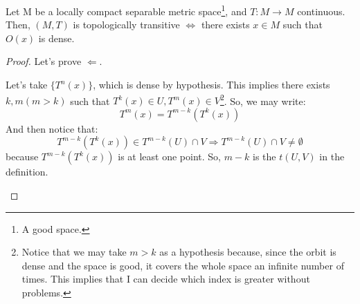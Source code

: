 \begin{proposition}
    Let M be a locally compact separable metric space\footnote{A good space.}, and $T:M\rightarrow M$ continuous. Then,  $(M, T)$ is topologically transitive $\iff$ there exists $x\in M$ such that $O(x)$ is dense.
\end{proposition}
\begin{proof}
    Let's prove $\Leftarrow$.

    Let's take $\{T^n(x)\}$, which is dense by hypothesis. This implies there exists $k,m (m>k)$ such that $T^k(x)\in U, T^m(x)\in V$\footnote{Notice that we may take $m>k$ as a hypothesis because, since the orbit is dense and the space is good, it covers the whole space an infinite number of times. This implies that I can decide which index is greater without problems.}. 
    So, we may write: \begin{equation*}
        T^m(x)=T^{m-k}(T^k(x))
    \end{equation*}
    And then notice that: \begin{equation*}
        T^{m-k}(T^k(x))\in T^{m-k}(U)\cap V \Rightarrow T^{m-k}(U)\cap V\neq \emptyset
    \end{equation*}
    because $T^{m-k}(T^k(x))$ is at least one point. So, $m-k$ is the $t(U, V)$ in the definition.

    \begin{figure}[ht]
\centering
{}
\end{figure}
\end{proof}
